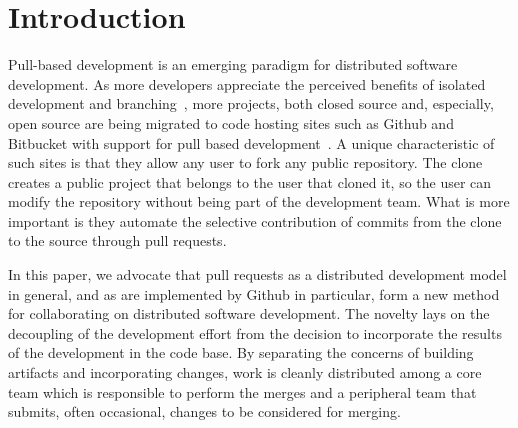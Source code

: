 \documentclass{acm_proc_article-sp}
\begin{document}


\section{Introduction}

%

Pull-based development is an emerging paradigm for distributed software
development. As more developers appreciate the perceived benefits of isolated
development and branching~\cite{Bird12}, more projects, both closed source and,
especially, open source are being migrated to code hosting sites such as Github
and Bitbucket with support for pull based development~\cite{Barr12}. A unique
characteristic of such sites is that they allow any user to fork any public
repository. The clone creates a public project that belongs to the user that
cloned it, so the user can modify the repository without being part of the
development team. What is more important is they automate the selective
contribution of commits from the clone to the source through pull requests. 

In this paper, we advocate that pull requests as a distributed development model
in general, and as are implemented by Github in particular,
form a new method for collaborating on distributed software development. The
novelty lays on the decoupling of the development effort from the decision to
incorporate the results of the development in the code base. By separating the
concerns of building artifacts and incorporating changes, work is cleanly
distributed among a core team which is responsible to perform the merges and a
peripheral team that submits, often occasional, changes to be considered for
merging.
\end{document}

